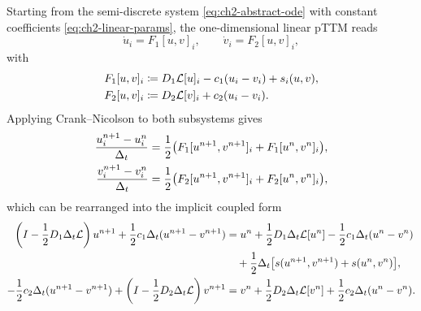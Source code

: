 Starting from the semi-discrete system \eqref{eq:ch2-abstract-ode} with constant coefficients \eqref{eq:ch2-linear-params}, the one-dimensional linear pTTM reads
\begin{equation}
    \dot{u}_i = F_1[u,v]_i, \qquad \dot{v}_i = F_2[u,v]_i,
\end{equation}
with
\begin{align}
    F_1[u,v]_i & \coloneqq D_1 \mathcal{L}[u]_i - c_1(u_i-v_i) + s_i(u,v), \notag \\
    F_2[u,v]_i & \coloneqq D_2 \mathcal{L}[v]_i + c_2(u_i-v_i).
\end{align}
Applying Crank--Nicolson to both subsystems gives
\begin{align}
    \frac{u_i^{n+1} - u_i^n}{\Delta_t}
     & =
    \frac{1}{2}\bigl(F_1[u^{n+1},v^{n+1}]_i + F_1[u^n,v^n]_i\bigr), \notag \\
    \frac{v_i^{n+1} - v_i^n}{\Delta_t}
     & =
    \frac{1}{2}\bigl(F_2[u^{n+1},v^{n+1}]_i + F_2[u^n,v^n]_i\bigr),
\end{align}
which can be rearranged into the implicit coupled form
\begin{align}
    \left(I - \frac{1}{2} D_1 \Delta_t \mathcal{L}\right)u^{n+1}
    + \frac{1}{2} c_1 \Delta_t (u^{n+1} - v^{n+1})
     & =
    u^n
    + \frac{1}{2} D_1 \Delta_t \mathcal{L}[u^n]
    - \frac{1}{2} c_1 \Delta_t (u^n - v^n) \notag                              \\
     & \quad
    + \frac{1}{2} \Delta_t \bigl[s(u^{n+1},v^{n+1}) + s(u^n,v^n)\bigr], \notag \\
    - \frac{1}{2} c_2 \Delta_t (u^{n+1} - v^{n+1})
    + \left(I - \frac{1}{2} D_2 \Delta_t \mathcal{L}\right)v^{n+1}
     & =
    v^n
    + \frac{1}{2} D_2 \Delta_t \mathcal{L}[v^n]
    + \frac{1}{2} c_2 \Delta_t (u^n - v^n). \notag
\end{align}

